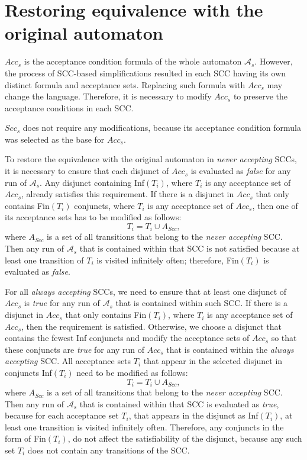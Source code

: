 \documentclass[
  digital, %
  twoside, %
  table,   %
  lof,     %
  lot,     %
]{fithesis3}
\begin{document}
\section{Restoring equivalence with the original automaton}
\label{sec:restore_equiv}
$Acc_s$ is the acceptance condition formula of the whole automaton $\mathcal{A}_s$. However, the process of SCC-based simplifications resulted in each SCC  having its own distinct formula and acceptance sets. Replacing such formula with $Acc_s$ may change the language. Therefore, it is necessary to modify $Acc_s$ to preserve the acceptance conditions in each SCC. 

$Scc_s$ does not require any modifications, because its acceptance condition formula was selected as the base for $Acc_s$.

To restore the equivalence with the original automaton in \emph{never accepting} SCCs, it is necessary to ensure that each disjunct of $Acc_s$ is evaluated as \emph{false} for any run of $\mathcal{A}_s$. Any disjunct containing Inf$(T_i)$, where $T_i$ is any acceptance set of $Acc_s$, already satisfies this requirement. If there is a disjunct in $Acc_s$ that only contains Fin$(T_i)$ conjuncts, where $T_i$ is any acceptance set of $Acc_s$, then one of its acceptance sets has to be modified as follows:
\begin{equation*}
  T_i = T_i \cup A_{Scc},
\end{equation*}
where $A_{Scc}$ is a set of all transitions that belong to the \emph{never accepting} SCC. Then any run of $\mathcal{A}_s$ that is contained within that SCC is not satisfied because at least one transition of $T_i$ is visited infinitely often; therefore, Fin$(T_i)$ is evaluated as \emph{false}.

For all \emph{always accepting} SCCs, we need to ensure that at least one disjunct of $Acc_s$ is \emph{true} for any run of $\mathcal{A}_s$ that is contained within such SCC. If there is a disjunct in $Acc_s$ that only contains Fin$(T_i)$, where $T_i$ is any acceptance set of $Acc_s$, then the requirement is satisfied. Otherwise, we choose a disjunct that contains the fewest Inf conjuncts and modify the acceptance sets of $Acc_s$ so that these conjuncts are \emph{true} for any run of $Acc_s$ that is contained within the \emph{always accepting} SCC. All acceptance sets $T_i$ that appear in the selected disjunct in conjuncts Inf$(T_i)$ need to be modified as follows:
\begin{equation*}
  T_i = T_i \cup A_{Scc},
\end{equation*}
where $A_{Scc}$ is a set of all transitions that belong to the \emph{never accepting} SCC. Then any run of $\mathcal{A}_s$ that is contained within that SCC is evaluated as \emph{true}, because for each acceptance set $T_i$, that appears in the disjunct as Inf$(T_i)$, at least one transition is visited infinitely often. Therefore, any conjuncts in the form of Fin$(T_i)$, do not affect the satisfiability of the disjunct, because any such set $T_i$ does not contain any transitions of the SCC.
\end{document}
